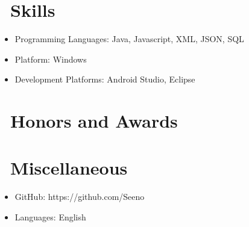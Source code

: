\documentclass{resume}
\begin{document}

\section{\faCogs\ Skills}
\begin{itemize}[parsep=0.5ex]
  \item Programming Languages: Java, Javascript, XML, JSON, SQL
  \item Platform: Windows
  \item Development Platforms: Android Studio, Eclipse
\end{itemize}

\section{\faHeartO\ Honors and Awards}

\section{\faInfo\ Miscellaneous}
\begin{itemize}[parsep=0.5ex]
  \item GitHub: https://github.com/Seeno
  \item Languages: English
\end{itemize}

%
%
\end{document}
